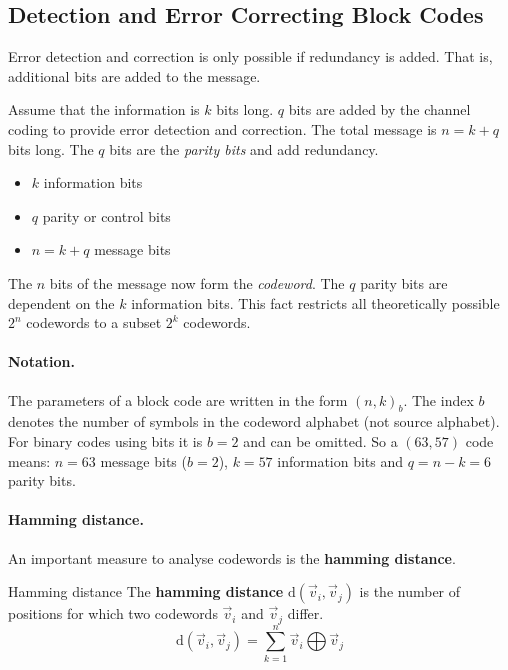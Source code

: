 \begin{refsection}
\subsection{Detection and Error Correcting Block Codes}

Error detection and correction is only possible if redundancy is added. That is, additional bits are added to the message.

Assume that the information is $k$ bits long. $q$ bits are added by the channel coding to provide error detection and correction. The total message is $n = k + q$ bits long. The $q$ bits are the \emph{parity bits} and add redundancy.

\begin{itemize}
	\item $k$ information bits
	\item $q$ parity or control bits
	\item $n = k + q$ message bits
\end{itemize}

The $n$ bits of the message now form the \emph{codeword}. The $q$ parity bits are dependent on the $k$ information bits. This fact restricts all theoretically possible $2^n$ codewords to a subset $2^k$ codewords.

\paragraph{Notation.}

The parameters of a block code are written in the form $(n, k)_b$. The index $b$ denotes the number of symbols in the codeword alphabet (not source alphabet). For binary codes using bits it is $b = 2$ and can be omitted. So a $(63, 57)$ code means: $n = 63$ message bits ($b = 2$), $k = 57$ information bits and $q = n - k = 6$ parity bits. 

\paragraph{Hamming distance.}

An important measure to analyse codewords is the  \textbf{hamming distance}.

\begin{definition}{Hamming distance}
	The  \textbf{hamming distance} $\mathrm{d}\left(\vec{v}_i, \vec{v}_j\right)$ is the number of positions for which two codewords $\vec{v}_i$ and $\vec{v}_j$ differ.
	\begin{equation}
		\mathrm{d}\left(\vec{v}_i, \vec{v}_j\right) = \sum\limits_{k=1}^{n} \vec{v}_i \bigoplus \vec{v}_j
	\end{equation}
\end{definition}


\end{refsection}
